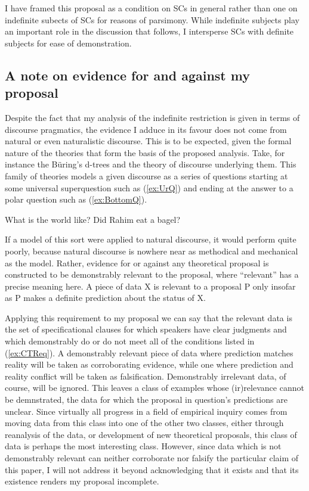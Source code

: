 \documentclass[
	letterpaper,
]{article}
\begin{document}
I have framed this proposal as a condition on SCs in general rather than one on indefinite subects of SCs for reasons of parsimony.
While indefinite subjects play an important role in the discussion that follows, I intersperse SCs with definite subjects for ease of demonstration.

\subsection{A note on evidence for and against my proposal}
Despite the fact that my analysis of the indefinite restriction is given in terms of discourse pragmatics, the evidence I adduce in its favour does not come from natural or even naturalistic discourse.
This is to be expected, given the formal nature of the theories that form the basis of the proposed analysis.
Take, for instance the B\"uring's d-trees and the theory of discourse underlying them.
This family of theories models a given discourse as a series of questions starting at some universal superquestion such as (\ref{ex:UrQ}) and ending at the answer to a polar question such as (\ref{ex:BottomQ}).
\begin{exe}
	\ex\label{ex:UrQ} What is the world like?
	\ex\label{ex:BottomQ} Did Rahim eat a bagel?
\end{exe}
If a model of this sort were applied to natural discourse, it would perform quite poorly, because natural discourse is nowhere near as methodical and mechanical as the model.
Rather, evidence for or against any theoretical proposal is constructed to be demonstrably relevant to the proposal, where ``relevant'' has a precise meaning here.
A piece of data X is relevant to a proposal P only insofar as P makes a definite prediction about the status of X.

Applying this requirement to my proposal we can say that the relevant data is the set of specificational clauses for which speakers have clear judgments and which demonstrably do or do not meet all of the conditions listed in (\ref{ex:CTReq}).
A demonstrably relevant piece of data where prediction matches reality will be taken as corroborating evidence, while one where prediction and reality conflict will be taken as falsification.
Demonstrably irrelevant data, of course, will be ignored.
This leaves a class of examples whose (ir)relevance cannot be demnstrated, the data for which the proposal in question's predictions are unclear.
Since virtually all progress in a field of empirical inquiry comes from moving data from this class into one of the other two classes, either through reanalysis of the data, or development of new theoretical proposals, this class of data is perhaps the most interesting class.
However, since data which is not demonstrably relevant can neither corroborate nor falsify the particular claim of this paper, I will not address it beyond acknowledging that it exists and that its existence renders my proposal incomplete.
\end{document}

